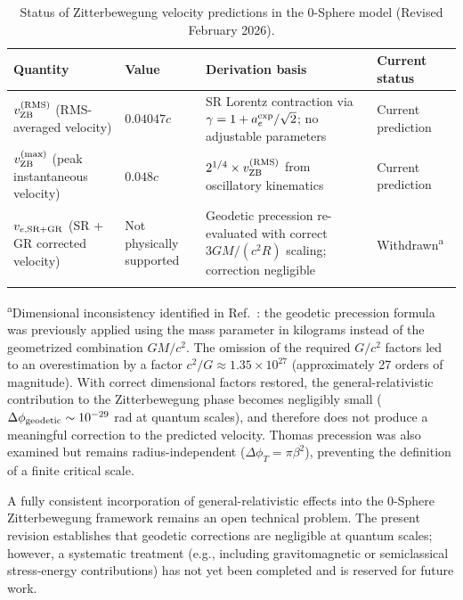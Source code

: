 \documentclass[%
 reprint,
 amsmath,amssymb,
 aps,
 prb,
]{revtex4-2}
\numberwithin{equation}{section}
\begin{document}
\begin{table}[t!]
\centering
\caption{Status of Zitterbewegung velocity predictions in the 0-Sphere model (Revised February 2026).}
\label{tab:velocity_status}
\renewcommand{\arraystretch}{1.4}
\begin{tabular}{p{5.0cm}p{3.0cm}p{5.0cm}p{3.5cm}}
\toprule
\textbf{Quantity} & \textbf{Value} & \textbf{Derivation basis} & \textbf{Current status} \\
\midrule
$v_{\rm ZB}^{\rm (RMS)}$ (RMS-averaged velocity)
& $0.04047c$
& SR Lorentz contraction via $\gamma = 1 + a_e^{\rm exp}/\sqrt{2}$; no adjustable parameters
& Current prediction \\
\addlinespace[0.3cm]
$v_{\rm ZB}^{\rm (max)}$ (peak instantaneous velocity)
& $0.048c$
& $2^{1/4} \times v_{\rm ZB}^{\rm (RMS)}$ from oscillatory kinematics
& Current prediction \\
\addlinespace[0.3cm]
$v_{e,\rm SR+GR}$ (SR + GR corrected velocity)
& Not physically supported
& Geodetic precession re-evaluated with correct $3GM/(c^2R)$ scaling; correction negligible
& Withdrawn\textsuperscript{a} \\
\addlinespace[0.2cm]
\bottomrule
\end{tabular}
\vspace{0.2cm}
\begin{minipage}{0.95\textwidth}
\justifying\footnotesize
\textsuperscript{a}Dimensional inconsistency identified in Ref.~\cite{Hanamura2025DimCorr}: 
the geodetic precession formula was previously applied using the mass parameter in kilograms 
instead of the geometrized combination $GM/c^2$. 
The omission of the required $G/c^2$ factors led to an overestimation by a factor 
$c^2/G \approx 1.35 \times 10^{27}$ (approximately 27 orders of magnitude). 
With correct dimensional factors restored, the general-relativistic contribution to the 
Zitterbewegung phase becomes negligibly small 
($\Delta\phi_{\rm geodetic} \sim 10^{-29}$ rad at quantum scales), 
and therefore does not produce a meaningful correction to the predicted velocity. 
Thomas precession was also examined but remains radius-independent 
($\Delta\phi_T = \pi\beta^2$), preventing the definition of a finite critical scale.

A fully consistent incorporation of general-relativistic effects into the 0-Sphere Zitterbewegung framework remains an open technical problem. The present revision establishes that geodetic corrections are negligible at quantum scales; however, a systematic treatment (e.g., including gravitomagnetic or semiclassical stress-energy contributions) has not yet been completed and is reserved for future work.
\end{minipage}

\end{table}
\end{document}
